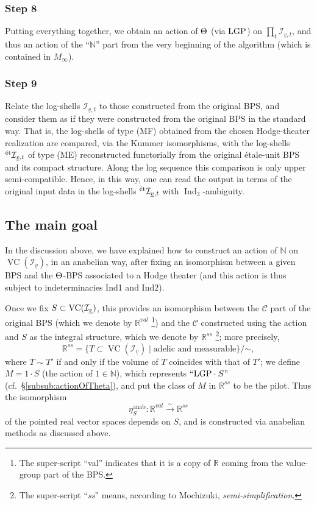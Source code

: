 \documentclass[12pt, reqno, a4paper]{amsart}
\def\udl#1{\underline{#1}} %
\def\simlongto{\stackrel{\sim}{\longrightarrow}} %
\def\bN{\mathbb{N}} %
\def\bR{\mathbb{R}} %
\def\cC{{\mathcal{C}}}
\def\cI{{\mathcal{I}}}
\def\uv{\udl{v}} %
\def\et{\textrm{\'et}}
\DeclareMathOperator{\VC}{VC}
\DeclareMathOperator{\Ind}{Ind}
\def\IndThree{\Ind_3}
\begin{document}
\subsubsection{Step 8}
Putting everything together, we obtain an action of $\Th$ (via $\LGP$) on $\prod_t \cI_{\uv,t}$, and thus an action of the ``$\bN$'' part from the very beginning of the algorithm (which is contained in $M_\infty$).

\subsubsection{Step 9}
Relate the log-shells $\cI_{\uv,t}$ to those constructed from the original BPS, and consider them as if they were constructed from the original BPS in the standard way.
That is, the log-shells of type (MF) obtained from the chosen Hodge-theater realization are compared, via the Kummer isomorphisms, with the log-shells $\LS[\et]_{\uv,t}$ of type (ME) reconstructed functorially from the original \'etale-unit BPS and its compact structure. Along the log sequence this comparison is only upper semi-compatible. Hence, in this way, one can read the output in terms of the original input data in the log-shells $\LS[\et]_{\uv,t}$ with $\IndThree$-ambiguity. 


\subsection{The main goal}\label{sub:theMainGoal}
In the discussion above, we have explained how to construct an action of $\bN$ on $\VC(\cI_{\uv})$, in an anabelian way, after fixing an isomorphism between a given BPS and the $\Th$-BPS associated to a Hodge theater (and this action is thus subject to indeterminacies Ind1 and Ind2).


Once we fix $S \subset \VC(\LS_{\uv})$, this provides an isomorphism between the $\cC$ part of the original BPS (which we denote by $\bR^{val}$ \footnote{The super-script ``val'' indicates that it is a copy of $\bR$ coming from the value-group part of the BPS.}) and the $\cC$ constructed using the action and $S$ as the integral structure, which we denote by $\bR^{ss}$ \footnote{The super-script ``{\it ss}'' means, according to Mochizuki, {\it semi-simplification}.}; more precisely, 
$$
\bR^{ss}=\{T\subset\VC(\cI_{\uv})\mid \text{adelic and measurable}\}/\mathord{\sim},
$$
where $T\sim T'$ if and only if the volume of $T$ coincides with that of $T'$; we define $M=1\cdot S$ (the action of $1\in \bN$), which represents ``$\LGP\cdot S$'' (cf.\ \S\ref{subsub:actionOfTheta}), and put the class of $M$ in $\bR^{ss}$ to be the pilot.
Thus the isomorphism 
\[ \eta^{\mathrm{anab}}_S : \bR^{val} \simlongto \bR^{ss} \]
of the pointed real vector spaces depends on $S$, and is constructed via anabelian methods as discussed above.
\end{document}
